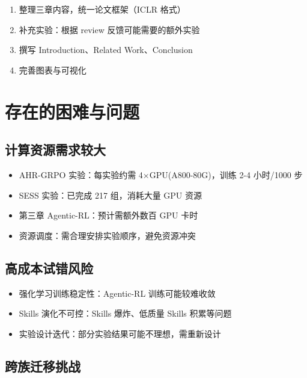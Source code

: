 \documentclass[12pt,a4paper]{article}
\begin{document}
\begin{enumerate}
    \item 整理三章内容，统一论文框架（ICLR 格式）
    \item 补充实验：根据 review 反馈可能需要的额外实验
    \item 撰写 Introduction、Related Work、Conclusion
    \item 完善图表与可视化
\end{enumerate}

\section{存在的困难与问题}

\subsection{计算资源需求较大}

\begin{itemize}
    \item AHR-GRPO 实验：每实验约需 4×GPU(A800-80G)，训练 2-4 小时/1000 步
    \item SESS 实验：已完成 217 组，消耗大量 GPU 资源
    \item 第三章 Agentic-RL：预计需额外数百 GPU 卡时
    \item 资源调度：需合理安排实验顺序，避免资源冲突
\end{itemize}

\subsection{高成本试错风险}

\begin{itemize}
    \item 强化学习训练稳定性：Agentic-RL 训练可能较难收敛
    \item Skills 演化不可控：Skills 爆炸、低质量 Skills 积累等问题
    \item 实验设计迭代：部分实验结果可能不理想，需重新设计
\end{itemize}

\subsection{跨族迁移挑战}
\end{document}
